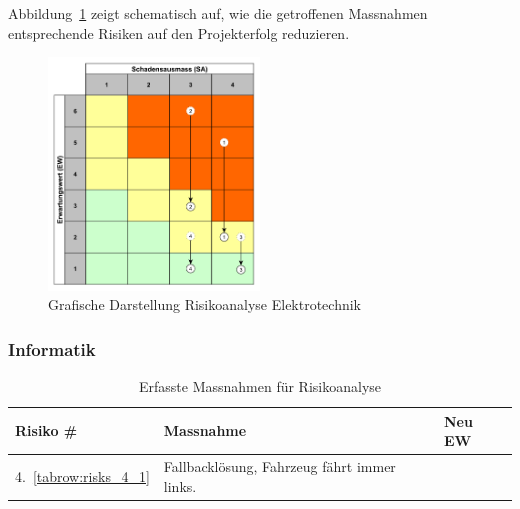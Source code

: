 \documentclass[main.tex]{subfiles} %
\begin{document}
Abbildung~\ref{fig:Diagramm_Risiko_elektro} zeigt schematisch auf, wie die
getroffenen Massnahmen entsprechende Risiken auf den Projekterfolg reduzieren.

\begin{figure}[h]
    \centering
    \includegraphics[width=0.5\textwidth]{./Risks_Diagramm/Diagramm_Risiko_elektro.pdf}
    \caption{Grafische Darstellung Risikoanalyse Elektrotechnik}
    \label{fig:Diagramm_Risiko_elektro}
\end{figure}


\subsubsection*{Informatik}

\begin{table}[H]
    \begin{tabularx}{\textwidth}{|>{\centering\arraybackslash}p{2cm}|>{\raggedright\arraybackslash}X|>{\centering\arraybackslash}p{0.75cm}|}
        \hline
        \textbf{Risiko \#}        & \textbf{Massnahme}
                                  & \textbf{Neu EW}                             \\

        \hline
        \rowcolor{yellow!30}
        4.~\ref{tabrow:risks_4_1} & Fallbacklösung, Fahrzeug fährt immer links.
                                  & 3                                           \\

        \hline

    \end{tabularx}
    \caption{Erfasste Massnahmen für Risikoanalyse}~\label{tab:Erfasste_Massnahmen}
\end{table}
\end{document}
